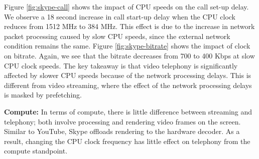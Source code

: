 

Figure \ref{fig:skype-call} shows the impact of CPU speeds on the call set-up delay.
We observe a 18 second increase in call start-up delay when the CPU clock reduces from 1512 MHz to 384 MHz. This effect is due to the increase in network packet processing caused by slow CPU speeds, since the external network condition remains the same. Figure \ref{fig:skype-bitrate} shows the impact of clock on bitrate. 
Again, we see that the bitrate decreases from 700 to 400 Kbps at slow CPU clock speeds. The key takeaway is that video telephony is significantly affected by slower CPU speeds because of the network processing delays. This is different from video streaming, where the effect of the network processing delays is masked by prefetching.








\noindent \textbf{Compute:} In terms of compute, there is little difference between streaming and telephony; both involve processing and rendering video frames on the screen. Similar to YouTube, Skype offloads rendering to the hardware decoder. As a result, changing the CPU clock frequency has little effect on telephony from the compute standpoint.

